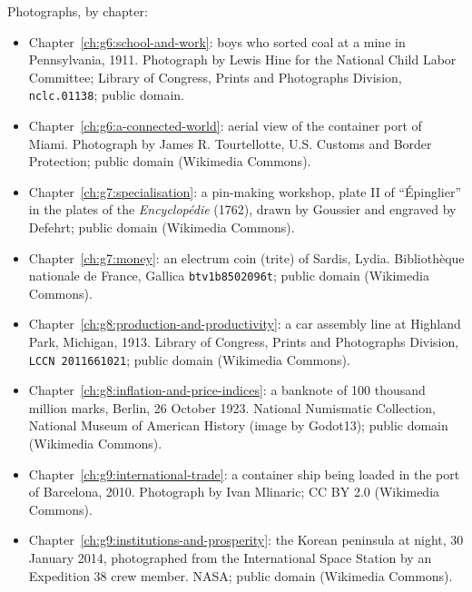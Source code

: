 \bigskip
\noindent Photographs, by chapter:
\begin{itemize}\small
  \item Chapter~\ref{ch:g6:school-and-work}: boys who sorted coal at a mine in
    Pennsylvania, 1911. Photograph by Lewis Hine for the National Child Labor
    Committee; Library of Congress, Prints and Photographs Division,
    \texttt{nclc.01138}; public domain.
  \item Chapter~\ref{ch:g6:a-connected-world}: aerial view of the container port
    of Miami. Photograph by James R. Tourtellotte, U.S. Customs and Border
    Protection; public domain (Wikimedia Commons).
  \item Chapter~\ref{ch:g7:specialisation}: a pin-making workshop, plate II of
    ``\'Epinglier'' in the plates of the \emph{Encyclop\'edie} (1762), drawn by
    Goussier and engraved by Defehrt; public domain (Wikimedia Commons).
  \item Chapter~\ref{ch:g7:money}: an electrum coin (trite) of Sardis, Lydia.
    Biblioth\`eque nationale de France, Gallica \texttt{btv1b8502096t}; public
    domain (Wikimedia Commons).
  \item Chapter~\ref{ch:g8:production-and-productivity}: a car assembly line at
    Highland Park, Michigan, 1913. Library of Congress, Prints and Photographs
    Division, \texttt{LCCN 2011661021}; public domain (Wikimedia Commons).
  \item Chapter~\ref{ch:g8:inflation-and-price-indices}: a banknote of 100 thousand
    million marks, Berlin, 26 October 1923. National Numismatic Collection, National
    Museum of American History (image by Godot13); public domain (Wikimedia Commons).
  \item Chapter~\ref{ch:g9:international-trade}: a container ship being loaded in
    the port of Barcelona, 2010. Photograph by Ivan Mlinaric; CC BY 2.0
    (Wikimedia Commons).
  \item Chapter~\ref{ch:g9:institutions-and-prosperity}: the Korean peninsula at
    night, 30 January 2014, photographed from the International Space Station by
    an Expedition 38 crew member. NASA; public domain (Wikimedia Commons).
\end{itemize}
